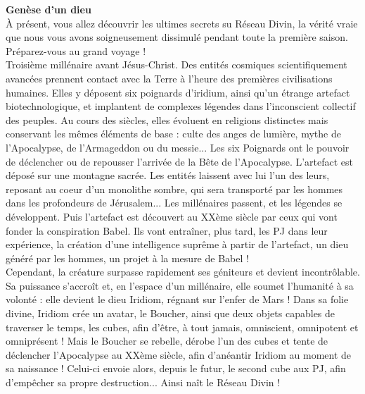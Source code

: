 \documentclass[11pt,twoside,a4paper]{book}
\begin{document}
\textbf{\Large Gen{\`e}se d'un dieu}~\\

{\`A} pr{\'e}sent, vous allez d{\'e}couvrir les ultimes secrets su R{\'e}seau Divin, la v{\'e}rit{\'e} vraie que nous vous avons soigneusement dissimul{\'e} pendant toute la premi{\`e}re saison. Pr{\'e}parez-vous au grand voyage ! ~\\

Troisi{\`e}me mill{\'e}naire avant J{\'e}sus-Christ. Des entit{\'e}s cosmiques scientifiquement avanc{\'e}es prennent contact avec la Terre {\`a} l'heure des premi{\`e}res civilisations humaines. Elles y d{\'e}posent six poignards d'iridium, ainsi qu'un {\'e}trange artefact biotechnologique, et implantent de complexes l{\'e}gendes dans l'inconscient collectif des peuples. Au cours des si{\`e}cles, elles {\'e}voluent en religions distinctes mais conservant les m{\^e}mes {\'e}l{\'e}ments de base : culte des anges de lumi{\`e}re, mythe de l'Apocalypse, de l'Armageddon ou du messie... Les six Poignards ont le pouvoir de d{\'e}clencher ou de repousser l'arriv{\'e}e de la B{\^e}te de l'Apocalypse. L'artefact est d{\'e}pos{\'e} sur une montagne sacr{\'e}e. Les entit{\'e}s laissent avec lui l'un des leurs, reposant au coeur d'un monolithe sombre, qui sera transport{\'e} par les hommes dans les profondeurs de J{\'e}rusalem... Les mill{\'e}naires passent, et les l{\'e}gendes se d{\'e}veloppent. Puis l'artefact est d{\'e}couvert au XX{\`e}me si{\`e}cle par ceux qui vont fonder la conspiration Babel. Ils vont entra{\^i}ner, plus tard, les PJ dans leur exp{\'e}rience, la cr{\'e}ation d'une intelligence supr{\^e}me {\`a} partir de l'artefact, un dieu g{\'e}n{\'e}r{\'e} par les hommes, un projet {\`a} la mesure de Babel ! ~\\

Cependant, la cr{\'e}ature surpasse rapidement ses g{\'e}niteurs et devient incontr{\^o}lable. Sa puissance s'accro{\^i}t et, en l'espace d'un mill{\'e}naire, elle soumet l'humanit{\'e} {\`a} sa volont{\'e} : elle devient le dieu Iridiom, r{\'e}gnant sur l'enfer de Mars ! Dans sa folie divine, Iridiom cr{\'e}e un avatar, le Boucher, ainsi que deux objets capables de traverser le temps, les cubes, afin d'{\^e}tre, {\`a} tout jamais, omniscient, omnipotent et omnipr{\'e}sent ! Mais le Boucher se rebelle, d{\'e}robe l'un des cubes et tente de d{\'e}clencher l'Apocalypse au XX{\`e}me si{\`e}cle, afin d'an{\'e}antir Iridiom au moment de sa naissance ! Celui-ci envoie alors, depuis le futur, le second cube aux PJ, afin d'emp{\^e}cher sa propre destruction... Ainsi na{\^i}t le R{\'e}seau Divin ! ~\\
\end{document}
